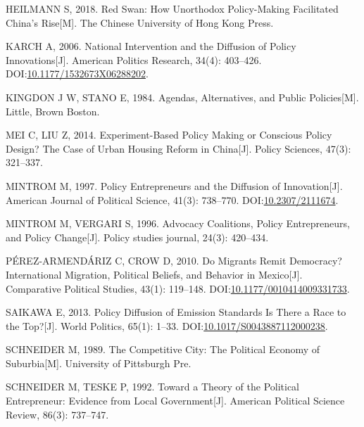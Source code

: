 \documentclass[
  12pt,
]{ctexart}
\newlength{\cslhangindent}
\newlength{\cslentryspacingunit} %
\newenvironment{CSLReferences}[2] %
 {%
  \setlength{\parindent}{0pt}
  \ifodd #1
  \let\oldpar\par
  \def\par{\hangindent=\cslhangindent\oldpar}
  \fi
  \setlength{\parskip}{#2\cslentryspacingunit}
 }%
 {}
\begin{document}
\begin{CSLReferences}{1}{0}
\leavevmode{}%
HEILMANN S, 2018. Red {Swan}: {How Unorthodox Policy-Making Facilitated China}'s {Rise}{[}M{]}. {The Chinese University of Hong Kong Press}.

\leavevmode{}%
KARCH A, 2006. National {Intervention} and the {Diffusion} of {Policy Innovations}{[}J{]}. American Politics Research, 34(4): 403--426. DOI:\href{https://doi.org/10.1177/1532673X06288202}{10.1177/1532673X06288202}.

\leavevmode{}%
KINGDON J W, STANO E, 1984. Agendas, Alternatives, and Public Policies{[}M{]}. {Little, Brown Boston}.

\leavevmode{}%
MEI C, LIU Z, 2014. Experiment-Based Policy Making or Conscious Policy Design? {The} Case of Urban Housing Reform in {China}{[}J{]}. Policy Sciences, 47(3): 321--337.

\leavevmode{}%
MINTROM M, 1997. Policy {Entrepreneurs} and the {Diffusion} of {Innovation}{[}J{]}. American Journal of Political Science, 41(3): 738--770. DOI:\href{https://doi.org/10.2307/2111674}{10.2307/2111674}.

\leavevmode{}%
MINTROM M, VERGARI S, 1996. Advocacy Coalitions, Policy Entrepreneurs, and Policy Change{[}J{]}. Policy studies journal, 24(3): 420--434.

\leavevmode{}%
PÉREZ-ARMENDÁRIZ C, CROW D, 2010. Do {Migrants Remit Democracy}? {International Migration}, {Political Beliefs}, and {Behavior} in {Mexico}{[}J{]}. Comparative Political Studies, 43(1): 119--148. DOI:\href{https://doi.org/10.1177/0010414009331733}{10.1177/0010414009331733}.

\leavevmode{}%
SAIKAWA E, 2013. Policy {Diffusion} of {Emission Standards Is There} a {Race} to the {Top}?{[}J{]}. World Politics, 65(1): 1--33. DOI:\href{https://doi.org/10.1017/S0043887112000238}{10.1017/S0043887112000238}.

\leavevmode{}%
SCHNEIDER M, 1989. The Competitive City: {The} Political Economy of Suburbia{[}M{]}. {University of Pittsburgh Pre}.

\leavevmode{}%
SCHNEIDER M, TESKE P, 1992. Toward a Theory of the Political Entrepreneur: Evidence from Local Government{[}J{]}. American Political Science Review, 86(3): 737--747.


\end{CSLReferences}
\end{document}
